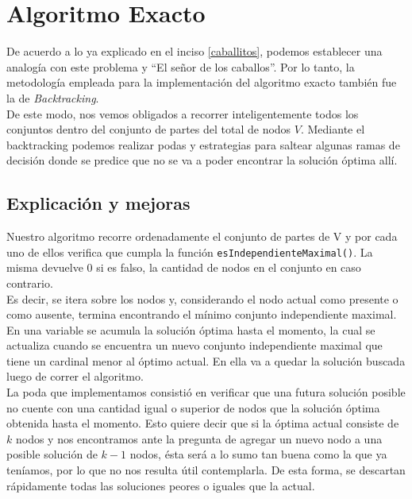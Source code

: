 \section{Algoritmo Exacto}
De acuerdo a lo ya explicado en el inciso \ref{caballitos}, podemos establecer una analog\'ia con este problema y ``El se\~nor de los caballos''. Por lo tanto, la metodolog\'ia empleada para la implementaci\'on del algoritmo exacto tambi\'en fue la de \emph{Backtracking}.\\

De este modo, nos vemos obligados a recorrer inteligentemente todos los conjuntos dentro del conjunto de partes del total de nodos $V$. Mediante el backtracking podemos realizar podas y estrategias para saltear algunas ramas de decisi\'on donde se predice que no se va a poder encontrar la soluci\'on \'optima all\'i.


\subsection{Explicaci\'on y mejoras}

Nuestro algoritmo recorre ordenadamente el conjunto de partes de V y por cada uno de ellos verifica que cumpla la funci\'on  \texttt{esIndependienteMaximal()}. La misma devuelve 0 si es falso, la cantidad de nodos en el conjunto en caso contrario.\\

Es decir, se itera sobre los nodos y, considerando el nodo actual como presente o como ausente, termina encontrando el m\'inimo conjunto independiente maximal.\\

En una variable se acumula la soluci\'on \'optima hasta el momento, la cual se actualiza cuando se encuentra un nuevo conjunto independiente maximal que tiene un cardinal menor al \'optimo actual. 
En ella va a quedar la soluci\'on buscada luego de correr el algoritmo.\\

La poda que implementamos consisti\'o en verificar que una futura soluci\'on posible no cuente con una cantidad igual o superior de nodos que la soluci\'on \'optima obtenida hasta el momento. 
Esto quiere decir que si la \'optima actual consiste de $k$ nodos y nos encontramos ante la pregunta de agregar un nuevo nodo a una posible soluci\'on de $k - 1$ nodos, \'esta ser\'a a lo sumo 
tan buena como la que ya ten\'iamos, por lo que no nos resulta \'util contemplarla. De esta forma, se descartan r\'apidamente todas las soluciones peores o iguales que la actual.\\

